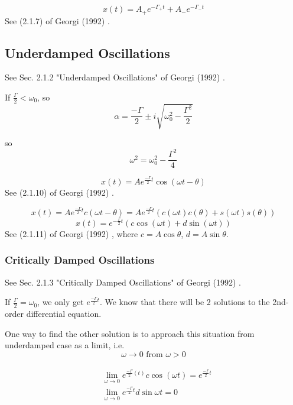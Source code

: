 \begin{equation}
	x(t) = A_+ e^{-\Gamma_+ t} + A_- e^{-\Gamma_- t}
\end{equation}
See (2.1.7) of Georgi (1992) \cite{agat:Geor1992}.

\subsection{Underdamped Oscillations} See Sec. 2.1.2 "Underdamped Oscillations" of Georgi (1992) \cite{agat:Geor1992}.

If $\frac{\Gamma}{2} < \omega_0$, so
\[
\alpha = \frac{-\Gamma }{2} \pm i \sqrt{ \omega_0^2 - \frac{\Gamma^2}{2} } 
\]

so 
\begin{equation}
	\omega^2 = \omega_0^2 - \frac{ \Gamma^2}{4}
\end{equation}

\begin{equation}
	x(t) = Ae^{\frac{-\Gamma}{2} t} \cos{ (\omega t- \theta)}
\end{equation}
See (2.1.10) of Georgi (1992) \cite{agat:Geor1992}.

\[
x(t) = A e^{\frac{-\Gamma}{2} t} c(\omega t - \theta) = Ae^{\frac{-\Gamma}{2}t } (c(\omega t) c(\theta) + s(\omega t) s(\theta))
\]
\begin{equation}\label{agat:Eq:UnderdampedOscillationsSolution}
	x(t) = e^{-\frac{\Gamma}{2}t} (c \cos{(\omega t)} + d\sin{(\omega t)})
\end{equation}
See (2.1.11) of Georgi (1992) \cite{agat:Geor1992}, where $c= A\cos{\theta}$, $d=A\sin{\theta}$.

\subsubsection{Critically Damped Oscillations} See Sec. 2.1.3 "Critically Damped Oscillations" of Georgi (1992) \cite{agat:Geor1992}.

If $\frac{\Gamma}{2} = \omega_0$, we only get $e^{\frac{-\Gamma}{2} t}$. We know that there will be 2 solutions to the 2nd-order differential equation.

One way to find the other solution is to approach this situation from underdamped case as a limit, i.e.
\[
\omega \to 0 \text{ from } \omega > 0
\]

\[
\begin{gathered}
	\begin{aligned}
		& \lim_{\omega \to 0} e^{ \frac{-\Gamma}{2}(t) } c\cos{(\omega t)} = e^{ \frac{-\Gamma}{2} t} \\
		& \lim_{\omega\to 0} e^{\frac{-\Gamma}{2} t} d \sin{\omega t} = 0
	\end{aligned}
\end{gathered}
\]

